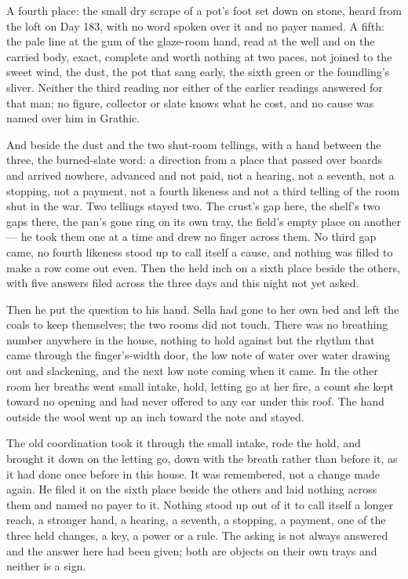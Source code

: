 A fourth place: the small dry scrape of a pot's foot set down on stone, heard from the loft on Day 183, with no word spoken over it and no payer named. A fifth: the pale line at the gum of the glaze-room hand, read at the well and on the carried body, exact, complete and worth nothing at two paces, not joined to the sweet wind, the dust, the pot that sang early, the sixth green or the foundling's sliver. Neither the third reading nor either of the earlier readings answered for that man; no figure, collector or slate knows what he cost, and no cause was named over him in Grathic.

And beside the dust and the two shut-room tellings, with a hand between the three, the burned-slate word: a direction from a place that passed over boards and arrived nowhere, advanced and not paid, not a hearing, not a seventh, not a stopping, not a payment, not a fourth likeness and not a third telling of the room shut in the war. Two tellings stayed two. The crust's gap here, the shelf's two gaps there, the pan's gone ring on its own tray, the field's empty place on another --- he took them one at a time and drew no finger across them. No third gap came, no fourth likeness stood up to call itself a cause, and nothing was filled to make a row come out even. Then the held inch on a sixth place beside the others, with five answers filed across the three days and this night not yet asked.

\scenebreak

Then he put the question to his hand. Sella had gone to her own bed and left the coals to keep themselves; the two rooms did not touch. There was no breathing number anywhere in the house, nothing to hold against but the rhythm that came through the finger's-width door, the low note of water over water drawing out and slackening, and the next low note coming when it came. In the other room her breaths went small intake, hold, letting go at her fire, a count she kept toward no opening and had never offered to any ear under this roof. The hand outside the wool went up an inch toward the note and stayed.

The old coordination took it through the small intake, rode the hold, and brought it down on the letting go, down with the breath rather than before it, as it had done once before in this house. It was remembered, not a change made again. He filed it on the sixth place beside the others and laid nothing across them and named no payer to it. Nothing stood up out of it to call itself a longer reach, a stronger hand, a hearing, a seventh, a stopping, a payment, one of the three held changes, a key, a power or a rule. The asking is not always answered and the answer here had been given; both are objects on their own trays and neither is a sign.

